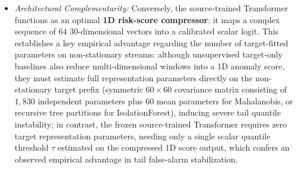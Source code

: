 \documentclass[12pt, a4paper, reqno, oneside]{book}
\begin{document}
\begin{itemize}
    \item \textit{Architectural Complementarity:} Conversely, the source-trained Transformer functions as an optimal \textbf{1D risk-score compressor}: it maps a complex sequence of 64 30-dimensional vectors into a calibrated scalar logit. This establishes a key empirical advantage regarding the number of target-fitted parameters on non-stationary streams: although unsupervised target-only baselines also reduce multi-dimensional windows into a 1D anomaly score, they must estimate full representation parameters directly on the non-stationary target prefix (symmetric $60 \times 60$ covariance matrix consisting of $1{,}830$ independent parameters plus $60$ mean parameters for Mahalanobis, or recursive tree partitions for IsolationForest), inducing severe tail quantile instability; in contrast, the frozen source-trained Transformer requires zero target representation parameters, needing only a single scalar quantile threshold $\tau$ estimated on the compressed 1D score output, which confers an observed empirical advantage in tail false-alarm stabilization.
\end{itemize}
\end{document}
